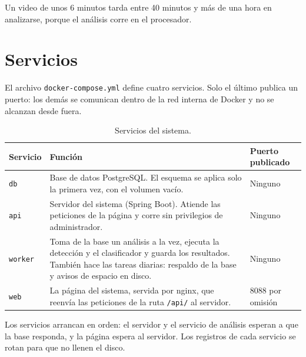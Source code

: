 Un video de unos 6 minutos tarda entre 40 minutos y más de una hora en analizarse,
porque el análisis corre en el procesador.

\section{Servicios}

El archivo \texttt{docker-compose.yml} define cuatro servicios. Solo el último
publica un puerto: los demás se comunican dentro de la red interna de Docker y no se
alcanzan desde fuera.

\begin{table}[H]
\centering
\caption{Servicios del sistema.}
\label{tab:ap_servicios}
\begin{tabular}{|p{1.8cm}|p{9.4cm}|p{2.6cm}|}
\hline
\textbf{Servicio} & \textbf{Función} & \textbf{Puerto publicado} \\
\hline
\texttt{db} & Base de datos PostgreSQL. El esquema se aplica solo la primera vez,
con el volumen vacío. & Ninguno \\
\hline
\texttt{api} & Servidor del sistema (Spring Boot). Atiende las peticiones de la
página y corre sin privilegios de administrador. & Ninguno \\
\hline
\texttt{worker} & Toma de la base un análisis a la vez, ejecuta la detección y el
clasificador y guarda los resultados. También hace las tareas diarias: respaldo de
la base y avisos de espacio en disco. & Ninguno \\
\hline
\texttt{web} & La página del sistema, servida por nginx, que reenvía las
peticiones de la ruta \texttt{/api/} al servidor. & 8088 por omisión \\
\hline
\end{tabular}
\end{table}

Los servicios arrancan en orden: el servidor y el servicio de análisis esperan a que
la base responda, y la página espera al servidor. Los registros de cada servicio se
rotan para que no llenen el disco.

